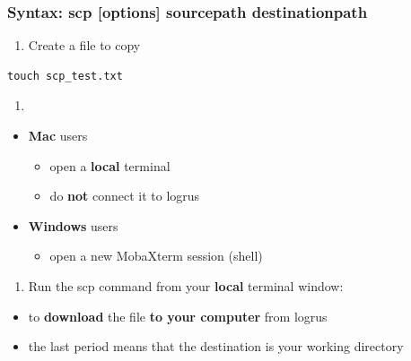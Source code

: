 \documentclass[
]{book}
\providecommand{\tightlist}{%
  \setlength{\itemsep}{0pt}\setlength{\parskip}{0pt}}
\begin{document}
\hypertarget{syntax-scp-options-sourcepath-destinationpath}{%
\subsubsection*{Syntax: scp {[}options{]} sourcepath destinationpath}\label{syntax-scp-options-sourcepath-destinationpath}}

\begin{enumerate}
\def\labelenumi{\arabic{enumi})}
\tightlist
\item
  Create a file to copy
\end{enumerate}

\begin{verbatim}
touch scp_test.txt
\end{verbatim}

\begin{enumerate}
\def\labelenumi{\arabic{enumi})}
\setcounter{enumi}{1}
\tightlist
\item
\end{enumerate}

\begin{itemize}
\tightlist
\item
  \textbf{Mac} users

  \begin{itemize}
  \tightlist
  \item
    open a \textbf{local} terminal
  \item
    do \textbf{not} connect it to logrus
  \end{itemize}
\item
  \textbf{Windows} users

  \begin{itemize}
  \tightlist
  \item
    open a new MobaXterm session (shell)
  \end{itemize}
\end{itemize}

\begin{enumerate}
\def\labelenumi{\arabic{enumi})}
\setcounter{enumi}{2}
\tightlist
\item
  Run the scp command from your \textbf{local} terminal window:
\end{enumerate}

\begin{itemize}
\tightlist
\item
  to \textbf{download} the file \textbf{to your computer} from logrus
\item
  the last period means that the destination is your working directory
\end{itemize}
\end{document}
